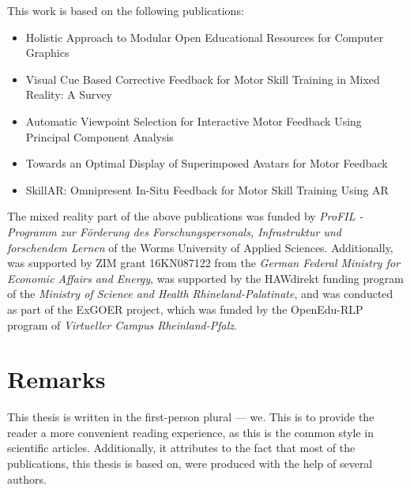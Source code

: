 This work is based on the following publications:
\begin{itemize}
	\setlength{\itemsep}{-0.3cm}
	\item Holistic Approach to Modular Open Educational Resources for Computer Graphics \cite{diller2024holistic}
	\item Visual Cue Based Corrective Feedback for Motor Skill Training in Mixed Reality: A Survey \cite{diller2022vcb}
	\item Automatic Viewpoint Selection for Interactive Motor Feedback Using Principal Component Analysis \cite{diller2024automatic}
	\item Towards an Optimal Display of Superimposed Avatars for Motor Feedback \cite{diller2025towards}
	\item SkillAR: Omnipresent In-Situ Feedback for Motor Skill Training Using AR \cite{diller2025skillar}
\end{itemize}


The mixed reality part of the above publications was funded by \emph{ProFIL - Programm zur Förderung des Forschungspersonals, Infrastruktur und forschendem Lernen} of the Worms University of Applied Sciences. Additionally, \cite{diller2024automatic} was supported by ZIM grant 16KN087122 from the \emph{German Federal Ministry for Economic Affairs and Energy}, \cite{diller2024skillar} was supported by the HAWdirekt funding program of the \emph{Ministry of Science and Health Rhineland-Palatinate}, and \cite{diller2024holistic} was conducted as part of the ExGOER project, which was funded by the OpenEdu-RLP program of \emph{Virtueller Campus Rheinland-Pfalz}.

\section{Remarks}

This thesis is written in the first-person plural --- we. This is to provide the reader a more convenient reading experience, as this is the common style in scientific articles. Additionally, it attributes to the fact that most of the publications, this thesis is based on, were produced with the help of several authors.